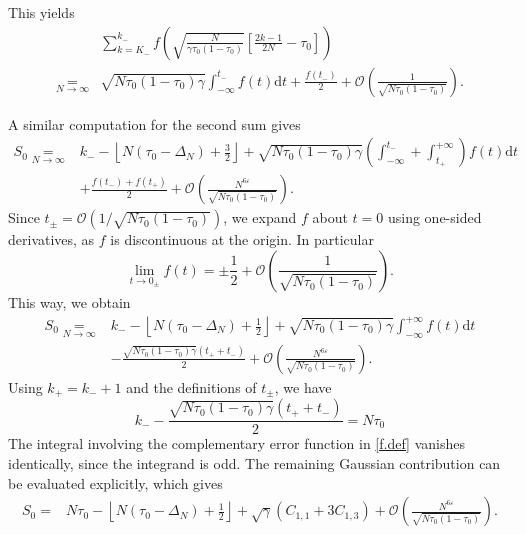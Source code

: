 \documentclass[pdflatex,sn-mathphys-num]{sn-jnl}
\theoremstyle{thmstyleone}
\numberwithin{equation}{section}
\begin{document}
This yields
\begin{equation}
\begin{split}
&\sum_{k=K_-}^{k_-} f\left(\sqrt{\frac{N}{\gamma\tau_0(1-\tau_0)}}\left[\frac{2k-1}{2N}-\tau_0\right]\right)\\
\underset{N\to\infty}{=}&\sqrt{N\tau_0(1-\tau_0)\gamma}\int_{-\infty}^{t_-} f\left(t\right)\mathrm{d}t+\frac{f(t_-)}{2}+\mathcal{O}\left(\frac{1}{\sqrt{N\tau_0(1-\tau_0)}}\right).
\end{split}
\end{equation}

A similar computation for the second sum gives
\begin{equation}
\begin{split}
S_0\underset{N\to\infty}{=}&k_--\left\lfloor N(\tau_0-\Delta_N)+\frac{3}{2}\right\rfloor+\sqrt{N\tau_0(1-\tau_0)\gamma}\left(\int_{-\infty}^{t_-} +\int_{t_+}^{+\infty}\right)f\left(t\right)\mathrm{d}t\\
&+\frac{f(t_-)+f(t_+)}{2}+\mathcal{O}\left(\frac{N^{6\varepsilon}}{\sqrt{N\tau_0(1-\tau_0)}}\right).
\end{split}
\end{equation}
Since $t_\pm=\mathcal{O}(1/\sqrt{N\tau_0(1-\tau_0)})$, we expand $f$ about $t=0$ using one-sided derivatives, as $f$ is discontinuous at the origin. In particular
\begin{equation}
    \lim_{t\to 0_{\pm}}f(t)=\pm\frac{1}{2}+\mathcal{O}\left(\frac{1}{\sqrt{N\tau_0(1-\tau_0)}}\right).
\end{equation}
This way, we obtain
\begin{equation}
\begin{split}
S_0\underset{N\to\infty}{=}&k_--\left\lfloor N(\tau_0-\Delta_N)+\frac{1}{2}\right\rfloor+\sqrt{N\tau_0(1-\tau_0)\gamma}\int_{-\infty}^{+\infty}f\left(t\right)\mathrm{d}t\\
&-\frac{\sqrt{N\tau_0(1-\tau_0)\gamma}(t_++t_-)}{2}+\mathcal{O}\left(\frac{N^{6\varepsilon}}{\sqrt{N\tau_0(1-\tau_0)}}\right).
\end{split}
\end{equation}
Using $k_{+}=k_{-}+1$ and the definitions of $t_{\pm}$, we have 
\begin{equation}
k_--\frac{\sqrt{N\tau_0(1-\tau_0)\gamma}(t_++t_-)}{2}=N\tau_0
\end{equation}
The integral involving the complementary error function in \eqref{f.def} vanishes identically, since the integrand is odd. The remaining Gaussian contribution can be evaluated explicitly, which gives
\begin{equation}
\begin{split}
S_0=&N\tau_0-\left\lfloor N(\tau_0-\Delta_N)+\frac{1}{2}\right\rfloor+\sqrt{\gamma}(C_{1,1}+3C_{1,3})+\mathcal{O}\left(\frac{N^{6\varepsilon}}{\sqrt{N\tau_0(1-\tau_0)}}\right).
\end{split}
\end{equation}
\end{document}
